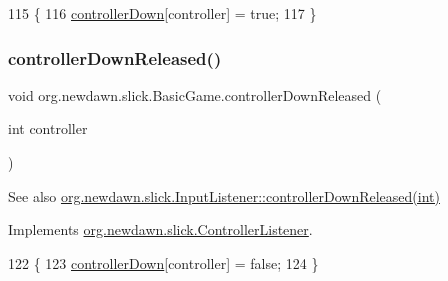 \begin{DoxyCode}
115                                                       \{
116         \mbox{\hyperlink{classorg_1_1newdawn_1_1slick_1_1_basic_game_a1e5447288fb667f4a688b930899379cb}{controllerDown}}[controller] = \textcolor{keyword}{true};
117     \}
\end{DoxyCode}
\mbox{\label{classorg_1_1newdawn_1_1slick_1_1_basic_game_a8953e34950de681231d62cb8e7297263}} 
\subsubsection{\texorpdfstring{controller\+Down\+Released()}{controllerDownReleased()}}
{\footnotesize\ttfamily void org.\+newdawn.\+slick.\+Basic\+Game.\+controller\+Down\+Released (\begin{DoxyParamCaption}\item[{int}]{controller }\end{DoxyParamCaption})\hspace{0.3cm}{\ttfamily [inline]}}

\begin{DoxySeeAlso}{See also}
\mbox{\hyperlink{interfaceorg_1_1newdawn_1_1slick_1_1_controller_listener_a7d0ca99c8cd5b0d332bece1d17befee7}{org.\+newdawn.\+slick.\+Input\+Listener\+::controller\+Down\+Released(int)}} 
\end{DoxySeeAlso}


Implements \mbox{\hyperlink{interfaceorg_1_1newdawn_1_1slick_1_1_controller_listener_a7d0ca99c8cd5b0d332bece1d17befee7}{org.\+newdawn.\+slick.\+Controller\+Listener}}.


\begin{DoxyCode}
122                                                        \{
123         \mbox{\hyperlink{classorg_1_1newdawn_1_1slick_1_1_basic_game_a1e5447288fb667f4a688b930899379cb}{controllerDown}}[controller] = \textcolor{keyword}{false};
124     \}
\end{DoxyCode}
\mbox{\label{classorg_1_1newdawn_1_1slick_1_1_basic_game_aef303720a5e704f28de381cd96f62467}} 
